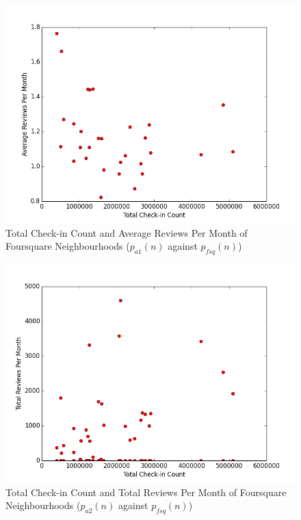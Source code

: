 \begin{figure}
\centering
\includegraphics[width=\columnwidth]{../checkin_avg_reviews.png}
\caption{Total Check-in Count and Average Reviews Per Month of Foursquare Neighbourhoods ($p_{a1}(n)$ against $p_{fsq}(n)$)}
\label{fig:checkin_avg_reviews}
\end{figure}
\begin{figure}
\centering
\includegraphics[width=\columnwidth]{../checkin_ttl_reviews.png}
\caption{Total Check-in Count and Total Reviews Per Month of Foursquare Neighbourhoods ($p_{a2}(n)$ against $p_{fsq}(n)$)}
\label{fig:checkin_ttl_reviews}
\end{figure}
